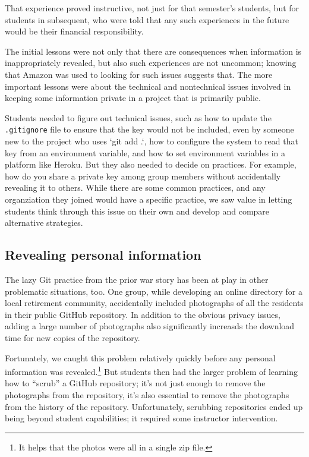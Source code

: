 That experience proved instructive, not just for that semester's
students, but for students in subsequent, who were told that any
such experiences in the future would be their financial responsibility.

The initial lessons were not only that there are consequences when
information is inappropriately revealed, but also such experiences
are not uncommon; knowing that Amazon was used to looking for such
issues suggests that.  The more important lessons were about the
technical and nontechnical issues involved in keeping some information
private in a project that is primarily public.

Students needed to figure out technical issues, such as how
to update the \texttt{.gitignore} file to ensure that the key would
not be included, even by someone new to the project who uses `git
add .`, how to configure the system to read that key from an
environment variable, and how to set environment variables in a
platform like Heroku.  But they also needed to decide on practices.
For example, how do you share a private key among group members without
accidentally revealing it to others.  While there are some common practices,
and any organziation they joined would have a specific practice, we saw
value in letting students think through this issue on their own and
develop and compare alternative strategies.

\subsection{Revealing personal information}

The lazy Git practice from the prior war story has been at play
in other problematic situations, too.  One group, while developing
an online directory for a local retirement community, accidentally
included photographs of all the residents in their public GitHub
repository.  In addition to the obvious privacy issues, adding a
large number of photographs also significantly increasds the download
time for new copies of the repository.

Fortunately, we caught this problem relatively quickly before any
personal information was revealed.\footnote{It helps that the photos
were all in a single zip file.}  But students then had the larger
problem of learning how to ``scrub'' a GitHub repository; it's not
just enough to remove the photographs from the repository, it's
also essential to remove the photographs from the history of the
repository.  Unfortunately, scrubbing repositories ended up being
beyond student capabilities; it required some instructor intervention.

